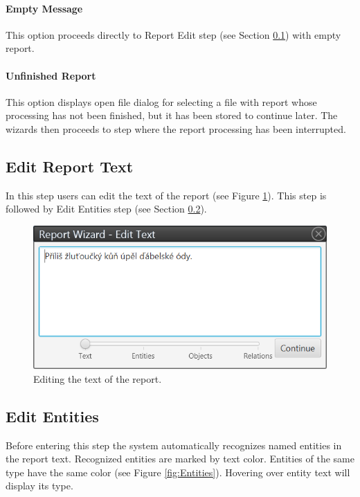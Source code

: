 \paragraph{Empty Message} This option proceeds directly to Report Edit step
(see Section \ref{sssec:ReportEdit}) with empty report.

\paragraph{Unfinished Report} This option displays open file dialog for
selecting a file with report whose processing has not been finished, but it
has been stored to continue later. The wizards then proceeds to step where
the report processing has been interrupted.

\subsection{Edit Report Text}
\label{sssec:ReportEdit}

In this step users can edit the text of the report (see Figure
\ref{fig:ReportEdit}). This step is followed by Edit Entities step (see Section
\ref{sssec:EditEntities}).

\begin{figure}[!htb]
        \centering
        \includegraphics[width=\textwidth]{Images/reportedit}
        \caption{Editing the text of the report.}
        \label{fig:ReportEdit}
\end{figure}

\subsection{Edit Entities}
\label{sssec:EditEntities}

Before entering this step the system automatically recognizes named entities
in the report text. Recognized entities are marked by text color. Entities of
the same type have the same color (see Figure \ref{fig:Entities}). Hovering over
entity text will display its type.

